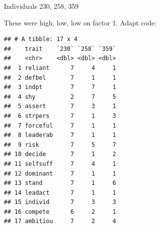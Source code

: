 \documentclass[
  ignorenonframetext,
]{beamer}
\newenvironment{Shaded}{\begin{snugshade}}{\end{snugshade}}
\newcommand{\DataTypeTok}[1]{\textcolor[rgb]{0.13,0.29,0.53}{#1}}
\newcommand{\DecValTok}[1]{\textcolor[rgb]{0.00,0.00,0.81}{#1}}
\newcommand{\FloatTok}[1]{\textcolor[rgb]{0.00,0.00,0.81}{#1}}
\newcommand{\KeywordTok}[1]{\textcolor[rgb]{0.13,0.29,0.53}{\textbf{#1}}}
\newcommand{\NormalTok}[1]{#1}
\newcommand{\OperatorTok}[1]{\textcolor[rgb]{0.81,0.36,0.00}{\textbf{#1}}}
\newcommand{\StringTok}[1]{\textcolor[rgb]{0.31,0.60,0.02}{#1}}
\begin{document}
\begin{frame}[fragile]{Individuals 230, 258, 359}
\protect\hypertarget{individuals-230-258-359}{}

These were high, low, low on factor 1. Adapt code:

\tiny

\begin{Shaded}
\end{Shaded}

\begin{verbatim}
## # A tibble: 17 x 4
##    trait    `230` `258` `359`
##    <chr>    <dbl> <dbl> <dbl>
##  1 reliant      7     4     1
##  2 defbel       7     1     1
##  3 indpt        7     7     1
##  4 shy          2     7     5
##  5 assert       7     3     1
##  6 strpers      7     1     3
##  7 forceful     7     1     1
##  8 leaderab     7     1     1
##  9 risk         7     5     7
## 10 decide       7     1     2
## 11 selfsuff     7     4     1
## 12 dominant     7     1     1
## 13 stand        7     1     6
## 14 leadact      7     1     1
## 15 individ      7     3     3
## 16 compete      6     2     1
## 17 ambitiou     7     2     4
\end{verbatim}

\normalsize

\end{frame}
\end{document}
